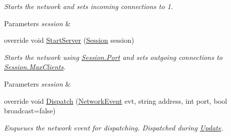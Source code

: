 \begin{DoxyCompactItemize}
\begin{DoxyCompactList}\small\item\em Starts the network and sets incoming connections to 1. 


\begin{DoxyParams}{Parameters}
{\em session} & \\
\hline
\end{DoxyParams}
 \end{DoxyCompactList}\item 
\hypertarget{class_skyrates_1_1_client_1_1_network_1_1_dummy_client_a450524b38c78346452f8f7127c14bc8b}{override void \hyperlink{class_skyrates_1_1_client_1_1_network_1_1_dummy_client_a450524b38c78346452f8f7127c14bc8b}{Start\-Server} (\hyperlink{class_skyrates_1_1_common_1_1_network_1_1_session}{Session} session)}\label{class_skyrates_1_1_client_1_1_network_1_1_dummy_client_a450524b38c78346452f8f7127c14bc8b}

\begin{DoxyCompactList}\small\item\em Starts the network using \hyperlink{class_skyrates_1_1_common_1_1_network_1_1_session_aed90ad75336095fa3287c961aba40c7b}{Session.\-Port} and sets outgoing connections to \hyperlink{class_skyrates_1_1_common_1_1_network_1_1_session_a4d9934f0f98f603daf947afacf49d3fb}{Session.\-Max\-Clients}. 


\begin{DoxyParams}{Parameters}
{\em session} & \\
\hline
\end{DoxyParams}
 \end{DoxyCompactList}\item 
\hypertarget{class_skyrates_1_1_client_1_1_network_1_1_dummy_client_ace4de9938d7ca4c3d008f2e9355e96c0}{override void \hyperlink{class_skyrates_1_1_client_1_1_network_1_1_dummy_client_ace4de9938d7ca4c3d008f2e9355e96c0}{Dispatch} (\hyperlink{class_skyrates_1_1_common_1_1_network_1_1_event_1_1_network_event}{Network\-Event} evt, string address, int port, bool broadcast=false)}\label{class_skyrates_1_1_client_1_1_network_1_1_dummy_client_ace4de9938d7ca4c3d008f2e9355e96c0}

\begin{DoxyCompactList}\small\item\em Enqueues the network event for dispatching. Dispatched during \hyperlink{class_skyrates_1_1_common_1_1_network_1_1_network_common_aeeaf913a5fe9ee8cb966271ee864bc08}{Update}. 



\end{DoxyCompactList}
\end{DoxyCompactItemize}
